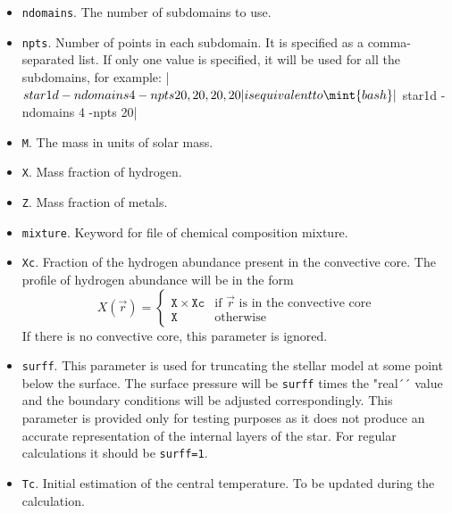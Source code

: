 \begin{itemize}
\item {\tt ndomains}. The number of subdomains to use.
\item {\tt npts}. Number of points in each subdomain. It is specified as a 
comma-separated list. 
If only one value is specified, it will be used for all the subdomains, for example:
|$ star1d -ndomains 4 -npts 20,20,20,20|  %
is equivalent to
\mint{bash}|$ star1d -ndomains 4 -npts 20|  %

\item {\tt M}. The mass in units of solar mass.
\item {\tt X}. Mass fraction of hydrogen.
\item {\tt Z}. Mass fraction of metals.
\item {\tt mixture}. Keyword for file of chemical composition mixture.
\item {\tt Xc}. Fraction of the hydrogen abundance present in the convective core. The profile
of hydrogen abundance will be in the form
$$X(\vec r)=\left\{
\begin{array}{ll}
\mathtt{X}\times \mathtt{Xc}&\mbox{if $\vec r$ is in the convective core}\\
\mathtt{X}&\mbox{otherwise}
\end{array}\right.$$
If there is no convective core, this parameter is ignored.

\item {\tt surff}. This parameter is used for truncating the stellar model
at some point below the surface. The surface pressure will be {\tt surff}
times the "real´´ value and the boundary conditions will be adjusted
correspondingly. This parameter is provided only for testing purposes as
it does not produce an accurate representation of the internal layers
of the star. For regular calculations it should be {\tt surff=1}.

\item {\tt Tc}. Initial estimation of the central temperature. To be
updated during the calculation.


\end{itemize}
